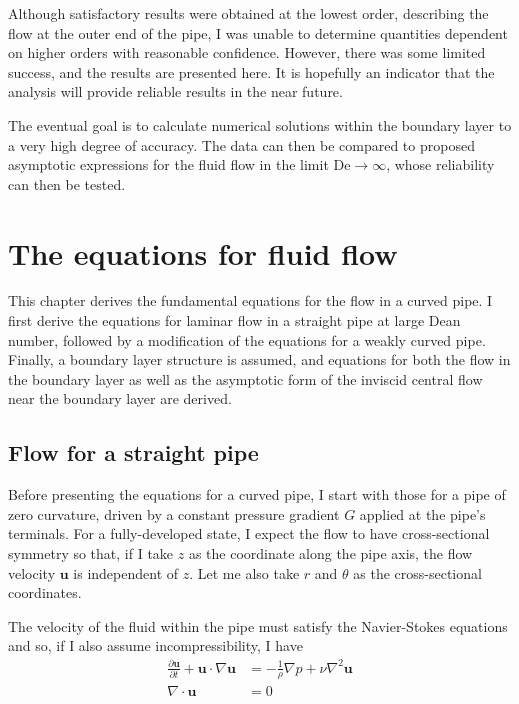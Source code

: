 \documentclass[10pt,a4paper]{report}
\begin{document}
Although satisfactory results were obtained at the lowest order, describing the flow at the outer end of the pipe, I was unable to determine quantities dependent on higher orders with reasonable confidence. However, there was some limited success, and the results are presented here. It is hopefully an indicator that the analysis will provide reliable results in the near future.

The eventual goal is to calculate numerical solutions within the boundary layer to a very high degree of accuracy. The data can then be compared to proposed asymptotic expressions for the fluid flow in the limit $\textrm{De} \rightarrow \infty$, whose reliability can then be tested.

\chapter{The equations for fluid flow}

This chapter derives the fundamental equations for the flow in a curved pipe. I first derive the equations for laminar flow in a straight pipe at large Dean number, followed by a modification of the equations for a weakly curved pipe. Finally, a boundary layer structure is assumed, and equations for both the flow in the boundary layer as well as the asymptotic form of the inviscid central flow near the boundary layer are derived.

\section{Flow for a straight pipe}

Before presenting the equations for a curved pipe, I start with those for a pipe of zero curvature, driven by a constant pressure gradient $G$ applied at the pipe's terminals. For a fully-developed state, I expect the flow to have cross-sectional symmetry so that, if I take $z$ as the coordinate along the pipe axis, the flow velocity $\bm{u}$ is independent of $z$. Let me also take $r$ and $\theta$ as the cross-sectional coordinates.

The velocity of the fluid within the pipe must satisfy the Navier-Stokes equations and so, if I also assume incompressibility, I have
\begin{subequations}
\begin{align}
\frac{\partial \bm{u}}{\partial t} + \bm{u} \cdot \nabla \bm{u} & = -\frac{1}{\rho} \nabla p + \nu \nabla^2 \bm{u} \label{navstokes} \\
\nabla \cdot \bm{u} & = 0 \label{incompress}
\end{align}
\end{subequations}
\end{document}
